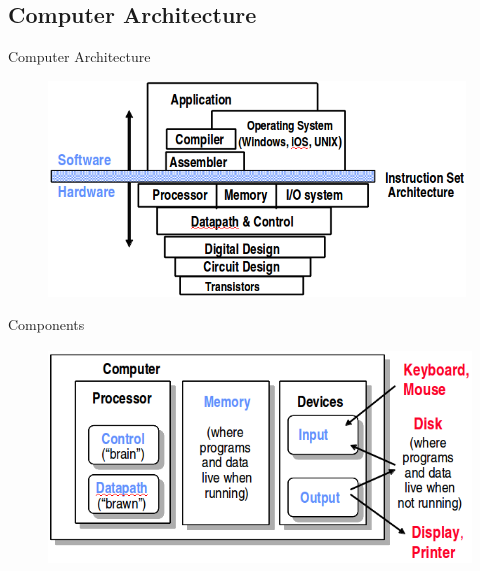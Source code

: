 \documentclass[xcolor=x11names,compress]{beamer}
\renewcommand{\(}{\begin{columns}}
\renewcommand{\)}{\end{columns}}
\newcommand{\<}[1]{\begin{column}{#1}}
\renewcommand{\>}{\end{column}}
\begin{document}
\subsection{Computer Architecture}
\begin{frame}{Computer Architecture}
 \begin{figure}
   \begin{center}
     \includegraphics[height=2.25in,clip]{ComputerArchitecture}
   \end{center}
 \end{figure}
\end{frame}

\begin{frame}{Components}
 \begin{figure}
   \begin{center}
     \includegraphics[height=2.25in,clip]{Components}
   \end{center}
 \end{figure}
\end{frame}

\end{document}
